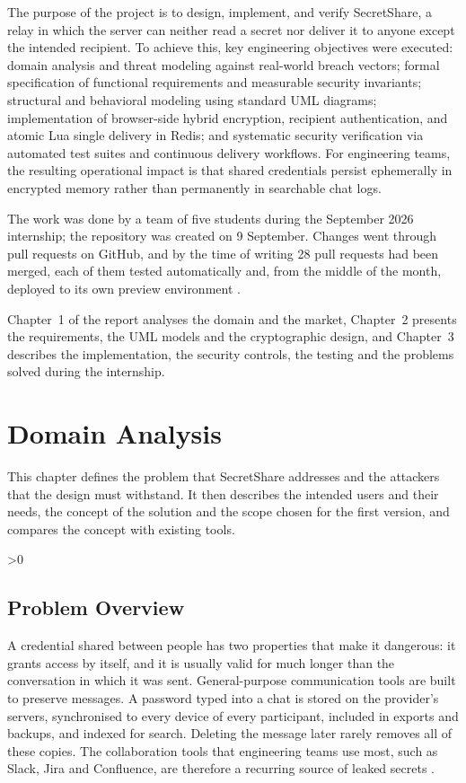 \documentclass[12pt,a4paper]{article}
\numberwithin{equation}{section}
\numberwithin{figure}{section}
\numberwithin{table}{section}
\newcommand{\subsec}[1]{%
  \ifnum\value{subsection}>0\clearpage\fi
  \subsection{#1}%
}
\begin{document}
The purpose of the project is to design, implement, and verify SecretShare, a relay in which the server can neither read a secret nor deliver it to anyone except the intended recipient. To achieve this, key engineering objectives were executed: domain analysis and threat modeling against real-world breach vectors; formal specification of functional requirements and measurable security invariants; structural and behavioral modeling using standard UML diagrams; implementation of browser-side hybrid encryption, recipient authentication, and atomic Lua single delivery in Redis; and systematic security verification via automated test suites and continuous delivery workflows. For engineering teams, the resulting operational impact is that shared credentials persist ephemerally in encrypted memory rather than permanently in searchable chat logs.

The work was done by a team of five students during the September 2026 internship; the repository was created on 9 September. Changes went through pull requests on GitHub, and by the time of writing 28 pull requests had been merged, each of them tested automatically and, from the middle of the month, deployed to its own preview environment \cite{secretsharerepo}.

Chapter~1 of the report analyses the domain and the market, Chapter~2 presents the requirements, the UML models and the cryptographic design, and Chapter~3 describes the implementation, the security controls, the testing and the problems solved during the internship.

\clearpage
\section{Domain Analysis}

This chapter defines the problem that SecretShare addresses and the attackers that the design must withstand. It then describes the intended users and their needs, the concept of the solution and the scope chosen for the first version, and compares the concept with existing tools.

\subsec{Problem Overview}

A credential shared between people has two properties that make it dangerous: it grants access by itself, and it is usually valid for much longer than the conversation in which it was sent. General-purpose communication tools are built to preserve messages. A password typed into a chat is stored on the provider's servers, synchronised to every device of every participant, included in exports and backups, and indexed for search. Deleting the message later rarely removes all of these copies. The collaboration tools that engineering teams use most, such as Slack, Jira and Confluence, are therefore a recurring source of leaked secrets \cite{gitguardian2025}.
\end{document}
